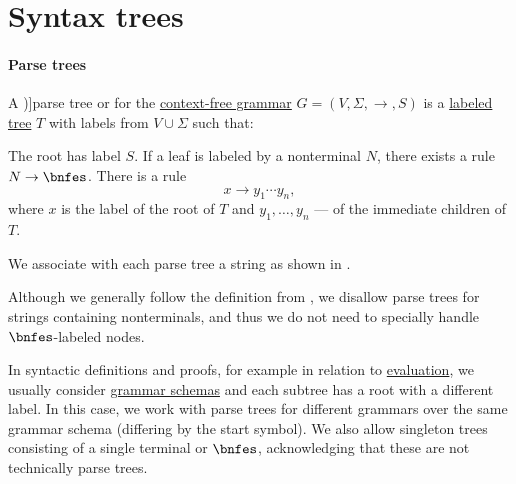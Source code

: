 \section{Syntax trees}\label{sec:syntax_trees}

\paragraph{Parse trees}

\begin{definition}\label{def:parse_tree}
  A \term[ru=дерево вывода (\cite[81]{Гладкий1973Языки})]{parse tree} or  for the \hyperref[def:chomsky_hierarchy/context_free]{context-free grammar} \( G = (V, \Sigma, \to, S) \) is a \hyperref[def:labeled_tree]{labeled tree} \( T \) with labels from \( V \cup \Sigma \) such that:
  \begin{thmenum}
     The root has label \( S \).
     If a leaf is labeled by a nonterminal \( N \), there exists a rule \( N \to \bnfes \).
     There is a rule
    \begin{equation*}
      x \to y_1 \cdots y_n,
    \end{equation*}
    where \( x \) is the label of the root of \( T \) and \( y_1, \ldots, y_n \) --- of the immediate children of \( T \).
  \end{thmenum}
\end{definition}
\begin{comments}
  \item We associate with each parse tree a string as shown in .
  \item Although we generally follow the definition from \cite[\S 2.2.3]{AhoEtAl2006Compilers}, we disallow parse trees for strings containing nonterminals, and thus we do not need to specially handle \( \bnfes \)-labeled nodes.
\end{comments}

\begin{remark}\label{rem:parse_tree_roots}
  In syntactic definitions and proofs, for example in relation to \hyperref[con:evaluation]{evaluation}, we usually consider \hyperref[def:formal_grammar/schema]{grammar schemas} and each subtree has a root with a different label. In this case, we work with parse trees for different grammars over the same grammar schema (differing by the start symbol). We also allow singleton trees consisting of a single terminal or \( \bnfes \), acknowledging that these are not technically parse trees.
\end{remark}


